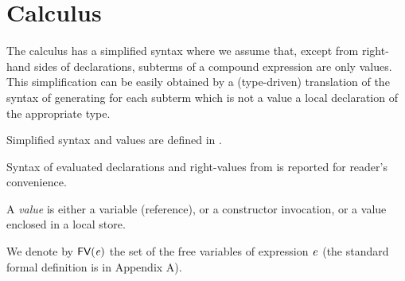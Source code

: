 \section{Calculus}\label{sect:calculus}
{The calculus has a simplified syntax where we assume that, except from right-hand sides of declarations, subterms of a compound expression are only {values}. This simplification can be easily obtained by a (type-driven) translation of the syntax of  generating for each subterm {which is not a value} a local declaration of the appropriate type.} 

Simplified syntax and values are defined in . 
\begin{figure*}
\caption{Simplified syntax and values}\label{fig:calculus}
\end{figure*}
{Syntax of evaluated declarations and right-values from  is reported for reader's convenience.}

A {\it value} is either a variable (reference), {or a constructor invocation}, or a {value} enclosed in a local store.

{We denote by $\textsf{FV}(\mathit{e})$ the set of the free variables of expression $\mathit{e}$ (the standard formal definition is in Appendix A).}

